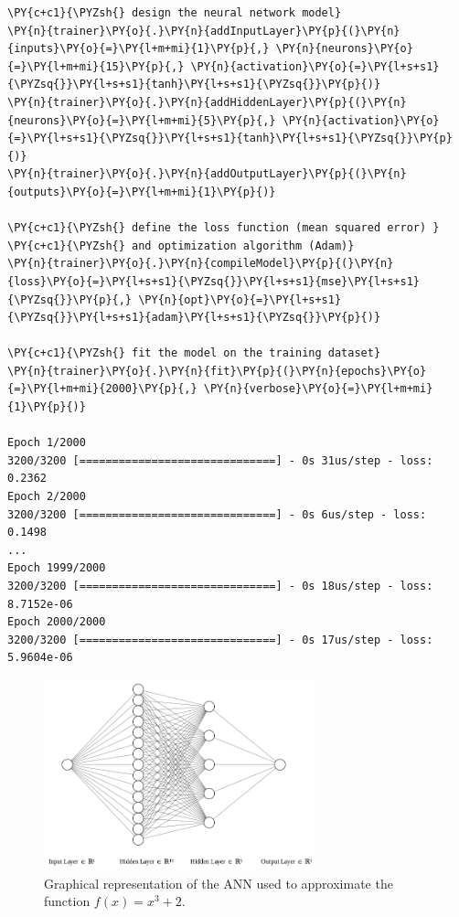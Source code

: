 \begin{tcolorbox}[breakable, size=fbox, boxrule=1pt, pad at break*=1mm,colback=cellbackground, colframe=cellborder]
\begin{Verbatim}[commandchars=\\\{\}]
\PY{c+c1}{\PYZsh{} design the neural network model}
\PY{n}{trainer}\PY{o}{.}\PY{n}{addInputLayer}\PY{p}{(}\PY{n}{inputs}\PY{o}{=}\PY{l+m+mi}{1}\PY{p}{,} \PY{n}{neurons}\PY{o}{=}\PY{l+m+mi}{15}\PY{p}{,} \PY{n}{activation}\PY{o}{=}\PY{l+s+s1}{\PYZsq{}}\PY{l+s+s1}{tanh}\PY{l+s+s1}{\PYZsq{}}\PY{p}{)}
\PY{n}{trainer}\PY{o}{.}\PY{n}{addHiddenLayer}\PY{p}{(}\PY{n}{neurons}\PY{o}{=}\PY{l+m+mi}{5}\PY{p}{,} \PY{n}{activation}\PY{o}{=}\PY{l+s+s1}{\PYZsq{}}\PY{l+s+s1}{tanh}\PY{l+s+s1}{\PYZsq{}}\PY{p}{)}
\PY{n}{trainer}\PY{o}{.}\PY{n}{addOutputLayer}\PY{p}{(}\PY{n}{outputs}\PY{o}{=}\PY{l+m+mi}{1}\PY{p}{)}
	
\PY{c+c1}{\PYZsh{} define the loss function (mean squared error) }
\PY{c+c1}{\PYZsh{} and optimization algorithm (Adam)}
\PY{n}{trainer}\PY{o}{.}\PY{n}{compileModel}\PY{p}{(}\PY{n}{loss}\PY{o}{=}\PY{l+s+s1}{\PYZsq{}}\PY{l+s+s1}{mse}\PY{l+s+s1}{\PYZsq{}}\PY{p}{,} \PY{n}{opt}\PY{o}{=}\PY{l+s+s1}{\PYZsq{}}\PY{l+s+s1}{adam}\PY{l+s+s1}{\PYZsq{}}\PY{p}{)}
	
\PY{c+c1}{\PYZsh{} fit the model on the training dataset}
\PY{n}{trainer}\PY{o}{.}\PY{n}{fit}\PY{p}{(}\PY{n}{epochs}\PY{o}{=}\PY{l+m+mi}{2000}\PY{p}{,} \PY{n}{verbose}\PY{o}{=}\PY{l+m+mi}{1}\PY{p}{)}
	
Epoch 1/2000
3200/3200 [==============================] - 0s 31us/step - loss: 0.2362
Epoch 2/2000
3200/3200 [==============================] - 0s 6us/step - loss: 0.1498
...
Epoch 1999/2000
3200/3200 [==============================] - 0s 18us/step - loss: 8.7152e-06
Epoch 2000/2000
3200/3200 [==============================] - 0s 17us/step - loss: 5.9604e-06
\end{Verbatim}
\end{tcolorbox}

\begin{figure}[htb]
	\centering
	\includegraphics[width=0.7\textwidth]{figures/ann_1.png}
	\caption{Graphical representation of the ANN used to approximate the function $f(x) = x^3 + 2$.}
        \label{fig:ann_1}
\end{figure}

